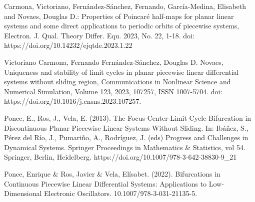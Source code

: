 \documentclass[12pt,a4paper]{report} %
\begin{document}
\begin{thebibliography}{99}
		 Carmona, Victoriano, Fernández-Sánchez, Fernando, García-Medina, Elisabeth and Novaes, Douglas D.: Properties of Poincaré half-maps for planar linear systems and some direct applications to periodic orbits of piecewise systems, Electron. J. Qual. Theory Differ. Equ. 2023, No. 22, 1-18. doi: https://doi.org/10.14232/ejqtde.2023.1.22
		
		 Victoriano Carmona, Fernando Fernández-Sánchez, Douglas D. Novaes,
		Uniqueness and stability of limit cycles in planar piecewise linear differential systems without sliding region,
		Communications in Nonlinear Science and Numerical Simulation,
		Volume 123, 2023, 107257, ISSN 1007-5704.
		doi: https://doi.org/10.1016/j.cnsns.2023.107257.
		
		 Ponce, E., Ros, J., Vela, E. (2013). The Focus-Center-Limit Cycle Bifurcation in Discontinuous Planar Piecewise Linear Systems Without Sliding. In: Ibáñez, S., Pérez del Río, J., Pumariño, A., Rodríguez, J. (eds) Progress and Challenges in Dynamical Systems. Springer Proceedings in Mathematics \& Statistics, vol 54. Springer, Berlin, Heidelberg. https://doi.org/10.1007/978-3-642-38830-9\_21
		
		 Ponce, Enrique \& Ros, Javier \& Vela, Elísabet. (2022). Bifurcations in Continuous Piecewise Linear Differential Systems: Applications to Low-Dimensional Electronic Oscillators. 10.1007/978-3-031-21135-5. 
		
	\end{thebibliography}
	
	\newpage
	

\end{document}
